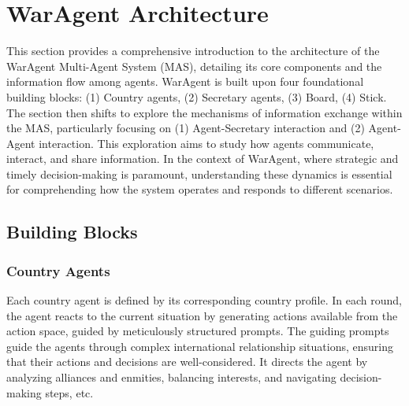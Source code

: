 \documentclass{article}
\newcommand{\yongfeng}[1]{{\small\color{blue}{\bf Yongfeng: #1}}}
\begin{document}
\section{WarAgent Architecture}



This section provides a comprehensive introduction to the architecture of the WarAgent Multi-Agent System (MAS), detailing its core components and the information flow among agents. WarAgent is built upon four foundational building blocks: (1) Country agents, (2) Secretary agents, (3) Board, (4) Stick. The section then shifts to explore the mechanisms of information exchange within the MAS, particularly focusing on (1) Agent-Secretary interaction and (2) Agent-Agent interaction. This exploration aims to study how agents communicate, interact, and share information. In the context of WarAgent, where strategic and timely decision-making is paramount, understanding these dynamics is essential for comprehending how the system operates and responds to different scenarios.

\subsection{Building Blocks}

\subsubsection{Country Agents}
Each country agent is defined by its corresponding country profile. In each round, the agent reacts to the current situation by generating actions available from the action space, guided by meticulously structured prompts.
The guiding prompts guide the agents through complex international relationship situations, ensuring that their actions and decisions are well-considered. It directs the agent by analyzing alliances and enmities, balancing interests, and navigating decision-making steps, etc. 
\end{document}
